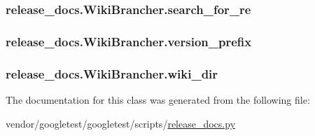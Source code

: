 \subsubsection[{\texorpdfstring{search\+\_\+for\+\_\+re}{search_for_re}}]{\setlength{\rightskip}{0pt plus 5cm}release\+\_\+docs.\+Wiki\+Brancher.\+search\+\_\+for\+\_\+re}\hypertarget{classrelease__docs_1_1WikiBrancher_a029ce9007fefd6ac5f13bacdedb29af5}{}\label{classrelease__docs_1_1WikiBrancher_a029ce9007fefd6ac5f13bacdedb29af5}
\subsubsection[{\texorpdfstring{version\+\_\+prefix}{version_prefix}}]{\setlength{\rightskip}{0pt plus 5cm}release\+\_\+docs.\+Wiki\+Brancher.\+version\+\_\+prefix}\hypertarget{classrelease__docs_1_1WikiBrancher_aae330aeef850b105795c5d75727448ba}{}\label{classrelease__docs_1_1WikiBrancher_aae330aeef850b105795c5d75727448ba}
\subsubsection[{\texorpdfstring{wiki\+\_\+dir}{wiki_dir}}]{\setlength{\rightskip}{0pt plus 5cm}release\+\_\+docs.\+Wiki\+Brancher.\+wiki\+\_\+dir}\hypertarget{classrelease__docs_1_1WikiBrancher_ad86478c9538ac0bf3916f67eb5da2910}{}\label{classrelease__docs_1_1WikiBrancher_ad86478c9538ac0bf3916f67eb5da2910}


The documentation for this class was generated from the following file\+:\begin{DoxyCompactItemize}
\item 
vendor/googletest/googletest/scripts/\hyperlink{release__docs_8py}{release\+\_\+docs.\+py}\end{DoxyCompactItemize}
